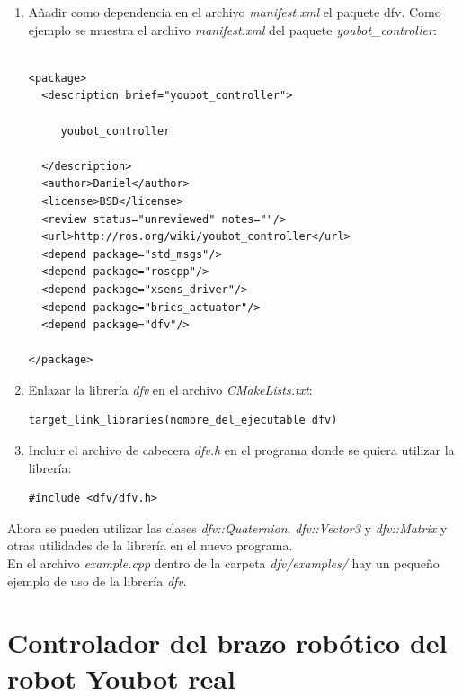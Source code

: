 \documentclass[12pt, a4paper]{report}
\begin{document}
\begin{enumerate}
\item Añadir como dependencia en el archivo \textit{manifest.xml} el paquete dfv. Como ejemplo se muestra el archivo \textit{manifest.xml} del paquete \textit{youbot\_controller}:

\begin{lstlisting}

<package>
  <description brief="youbot_controller">

     youbot_controller

  </description>
  <author>Daniel</author>
  <license>BSD</license>
  <review status="unreviewed" notes=""/>
  <url>http://ros.org/wiki/youbot_controller</url>
  <depend package="std_msgs"/>
  <depend package="roscpp"/>
  <depend package="xsens_driver"/>
  <depend package="brics_actuator"/>
  <depend package="dfv"/>

</package>

\end{lstlisting}

\item Enlazar la librería \textit{dfv} en el archivo \textit{CMakeLists.txt}:

\begin{lstlisting}
target_link_libraries(nombre_del_ejecutable dfv)
\end{lstlisting}

\item Incluir el archivo de cabecera \textit{dfv.h} en el programa donde se quiera utilizar la librería:

\begin{lstlisting}
#include <dfv/dfv.h>
\end{lstlisting}

\end{enumerate}

Ahora se pueden utilizar las clases \textit{dfv::Quaternion}, \textit{dfv::Vector3} y \textit{dfv::Matrix} y otras utilidades de la librería en el nuevo programa.\\

En el archivo \textit{example.cpp} dentro de la carpeta \textit{dfv/examples/} hay un pequeño ejemplo de uso de la librería \textit{dfv}.

\section{Controlador del brazo robótico del robot Youbot real}
\end{document}

